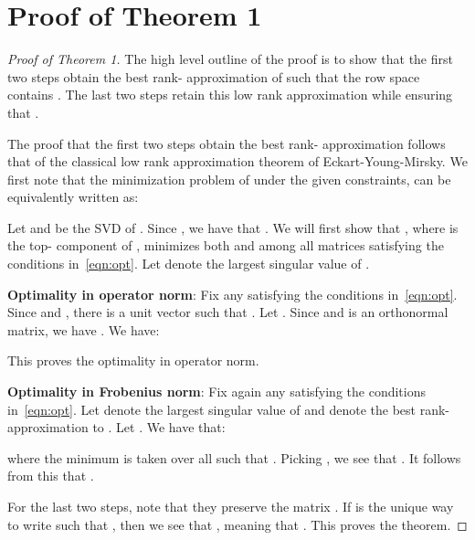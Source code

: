 \documentclass{article}
\begin{document}
\section{Proof of Theorem 1}\label{app:proof}
\begin{proof}[Proof of Theorem 1] The high level outline of the proof is to show that the first two steps obtain the best rank- approximation of  such that the row space contains . The last two steps retain this low rank approximation while ensuring that .

The proof that the first two steps obtain the best rank- approximation follows that of the classical low rank approximation theorem of Eckart-Young-Mirsky. We first note that the minimization problem of  under the given constraints, can be equivalently written as:

Let  and  be the SVD of . Since , we have that . We will first show that , where  is the top- component of , minimizes both  and  among all matrices  satisfying the conditions in~\eqref{eqn:opt}. Let  denote the  largest singular value of .

\textbf{Optimality in operator norm}: Fix any  satisfying the conditions in~\eqref{eqn:opt}. Since  and , there is a unit vector  such that . Let . Since  and  is an orthonormal matrix, we have . We have:

This proves the optimality in operator norm.

\textbf{Optimality in Frobenius norm}:
Fix again any  satisfying the conditions in~\eqref{eqn:opt}. Let  denote the  largest singular value of  and  denote the best rank- approximation to . Let . We have that:

where the minimum is taken over all  such that . Picking , we see that . It follows from this that .

For the last two steps, note that they preserve the matrix . If  is the unique way to write  such that , then we see that , meaning that . This proves the theorem.






\end{proof}
  
\end{document}
